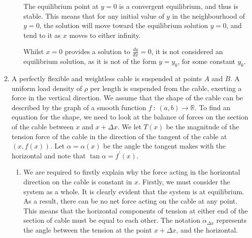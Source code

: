 \documentclass[a4paper]{article}
\begin{document}
\begin{enumerate}[label=\textbf{\arabic*.}]
\begin{enumerate}
		\bigbreak

		The equilibrium point at $\displaystyle{y=0}$ is a convergent equilibrium, and thus is stable. This means that for any initial value of $\displaystyle{y}$ in the neighbourhood of $\displaystyle{y=0}$, the solution will move toward the equilibrium solution $\displaystyle{y=0}$, and tend to it as $\displaystyle{x}$ moves to either infinity.

		\bigbreak

		Whilst $\displaystyle{x=0}$ provides a solution to $\displaystyle{\frac{dy}{dx}=0}$, it is not considered an equilibrium solution, as it is not of the form $\displaystyle{y = y_0}$, for some constant $\displaystyle{y_0}$.


	\end{enumerate}

	\pagebreak

	\item A perfectly flexible and weightless cable is suspended at points $\displaystyle{A}$ and $\displaystyle{B}$. A uniform load density of $\displaystyle{\rho}$ per length is suspended from the cable, exerting a force in the vertical direction. We assume that the shape of the cable can be described by the graph of a smooth function $\displaystyle{f\: : \: (a,b) \rightarrow \mathbb{R}}$. To find an equation for the shape, we need to look at the balance of forces on the section of the cable between $\displaystyle{x}$ and $\displaystyle{x+\Delta x}$. We let $\displaystyle{T(x)}$ be the magnitude of the tension force of the cable in the direction of the tangent of the cable at $\displaystyle{(x,f(x))}$. Let $\displaystyle{\alpha = \alpha(x)}$ be the angle the tangent makes with the horizontal and note that $\displaystyle{\tan{\alpha} = f^{\prime}(x)}$.

	\begin{enumerate}
		\item We are required to firstly explain why the force acting in the horizontal direction on the cable is constant in $\displaystyle{x}$. Firstly, we must consider the system as a whole. It is clearly evident that the system is at equilibrium. As a result, there can be no net force acting on the cable at any point. This means that the horizontal components of tension at either end of the section of cable must be equal to each other. The notation $\displaystyle{\alpha_{\Delta x}}$ represents the angle between the tension at the point $\displaystyle{x + \Delta x}$, and the horizontal.

		\begin{center}
		\begin{tikzpicture}


\end{tikzpicture}
\end{center}
\end{enumerate}
\end{enumerate}
\end{document}
